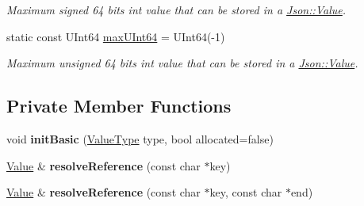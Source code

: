 \begin{DoxyCompactItemize}
\begin{DoxyCompactList}\small\item\em Maximum signed 64 bits int value that can be stored in a \hyperlink{class_json_1_1_value}{Json\+::\+Value}. \end{DoxyCompactList}\item 
\hypertarget{class_json_1_1_value_ae1eb89c305c39516696ff305cffa01da}{}static const U\+Int64 \hyperlink{class_json_1_1_value_ae1eb89c305c39516696ff305cffa01da}{max\+U\+Int64} = U\+Int64(-\/1)\label{class_json_1_1_value_ae1eb89c305c39516696ff305cffa01da}

\begin{DoxyCompactList}\small\item\em Maximum unsigned 64 bits int value that can be stored in a \hyperlink{class_json_1_1_value}{Json\+::\+Value}. \end{DoxyCompactList}\end{DoxyCompactItemize}
\subsection*{Private Member Functions}
\begin{DoxyCompactItemize}
\item 
\hypertarget{class_json_1_1_value_a32b86b71564157f40f880f5736be822a}{}void {\bfseries init\+Basic} (\hyperlink{namespace_json_a7d654b75c16a57007925868e38212b4e}{Value\+Type} type, bool allocated=false)\label{class_json_1_1_value_a32b86b71564157f40f880f5736be822a}

\item 
\hypertarget{class_json_1_1_value_a9ff9cdae2c8f4155bab603d750b0b3f1}{}\hyperlink{class_json_1_1_value}{Value} \& {\bfseries resolve\+Reference} (const char $\ast$key)\label{class_json_1_1_value_a9ff9cdae2c8f4155bab603d750b0b3f1}

\item 
\hypertarget{class_json_1_1_value_a121c76136ac3255ad3de088b50652acb}{}\hyperlink{class_json_1_1_value}{Value} \& {\bfseries resolve\+Reference} (const char $\ast$key, const char $\ast$end)\label{class_json_1_1_value_a121c76136ac3255ad3de088b50652acb}

\end{DoxyCompactItemize}
